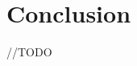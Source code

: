 \documentclass[part3.tex]{subfiles}
\begin{document}
\chapter{Conclusion}
{\huge //TODO}
\end{document}
